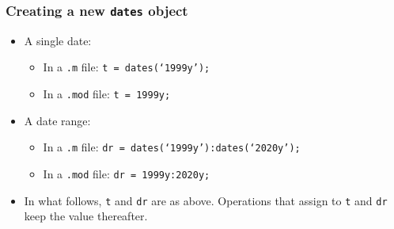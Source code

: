 \documentclass[10pt]{beamer}
\begin{document}
\begin{frame}[fragile,t]
  \frametitle{Creating a new \texttt{dates} object}
  \begin{itemize}
  \item A single date:
    \begin{itemize}
    \item In a \texttt{.m} file: \texttt{t = dates(`1999y');}
    \item In a \texttt{.mod} file: \texttt{t = 1999y;}
    \end{itemize}
  \item A date range:
    \begin{itemize}
    \item In a \texttt{.m} file: \texttt{dr = dates(`1999y'):dates(`2020y');}
    \item In a \texttt{.mod} file: \texttt{dr = 1999y:2020y;}
    \end{itemize}
  \item In what follows, \texttt{t} and \texttt{dr} are as above. Operations that assign to \texttt{t} and \texttt{dr} keep the value thereafter.
  \end{itemize}
\end{frame}
\end{document}
